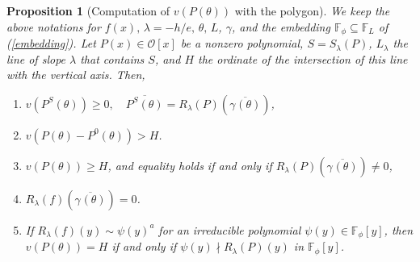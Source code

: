 \documentclass{amsart}
\newtheorem{proposition}[theorem]{Proposition}
\def\ff#1{\mathbb{F}_{#1}}
\def\fph{\mathbb{F}_{\phi}}
\def\ga{\gamma}
\def\gb#1{\overline{\gamma_{#1}(\t)}}
\def\la{\lambda}
\def\oo{{\mathcal O}}
\def\t{\theta}
\def\zpx{\oo[x]}
\begin{document}
\begin{proposition}[Computation of $v(P(\t))$ with the polygon]\label{vqt}
We keep the above notations for $f(x),\,\la=-h/e,\,\t,\,L$, $\ga$, and the embedding $\fph\subseteq \ff{L}$ of (\ref{embedding}). Let $P(x)\in\zpx$ be a nonzero polynomial, $S=S_{\la}(P)$, $L_{\la}$ the line of slope $\la$ that contains $S$, and $H$ the ordinate of the intersection of this line with the vertical axis. Then,  
\begin{enumerate}
 \item $v(P^S(\t))\ge0,\quad \overline{P^S(\t)}=R_{\la}(P)(\gb{})$,
\item $v(P(\t)-P^0(\t))>H$.
\item $v(P(\t))\ge H$, and equality holds if and only if $R_{\la}(P)(\gb{})\ne0$,
\item $R_{\la}(f)(\gb{})=0$.
\item  If $R_{\la}(f)(y)\sim \psi(y)^a$ for an irreducible polynomial $\psi(y)\in\fph[y]$, then $v(P(\t))=H$  if and only if $\psi(y)\nmid R_{\la}(P)(y)$ in $\fph[y]$.
\end{enumerate}
\end{proposition}
\end{document}
